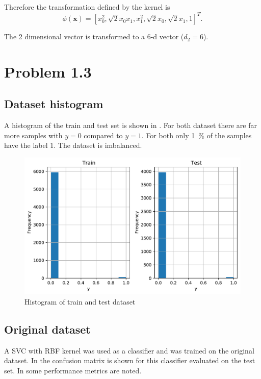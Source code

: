 \documentclass[12pt,a4paper]{scrartcl}
\newcommand{\matr}[1]{\mathbf{#1}}
\begin{document}
	Therefore the transformation defined by the kernel is
	\begin{equation}
		\phi(\matr{x}) = \left[x_0^2, \sqrt{2}x_0 x_1, x_1^2, \sqrt{2} x_0, \sqrt{2} x_1, 1 \right]^T.
	\end{equation}
	
	The 2 dimensional vector is transformed to a 6-d vector ($d_2=6$).
	
	\section*{Problem 1.3}
	
	\subsection*{Dataset histogram}
	
	A histogram of the train and test set is shown in . For both dataset there are far more samples with $y=0$ compared to $y=1$. For both only \SI{1}{\percent} of the samples have the label $1$.  The dataset is imbalanced.
	
	\begin{figure}[H]
		\centering	\includegraphics[width=0.85\linewidth]{figs/ex2_3_hist.pdf}
		\caption{Histogram of train and test dataset}
		\label{fig:ex2_3_hist}
	\end{figure}
	
	\subsection*{Original dataset}
	A SVC with RBF kernel was used as a classifier and was trained on the original dataset.
	In  the confusion matrix is shown for this classifier evaluated on the test set. In  some performance metrics are noted. 
	
\end{document}
